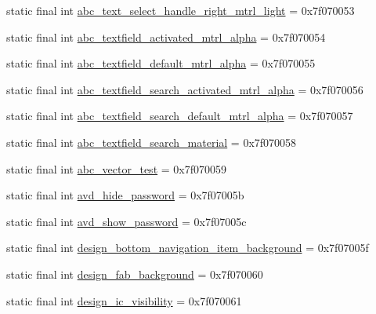 \begin{DoxyCompactItemize}
static final int \mbox{\hyperlink{classandroid_1_1support_1_1design_1_1_r_1_1drawable_a60a81d3c3c729bb2d56b498af413fef4}{abc\+\_\+text\+\_\+select\+\_\+handle\+\_\+right\+\_\+mtrl\+\_\+light}} = 0x7f070053
\item 
static final int \mbox{\hyperlink{classandroid_1_1support_1_1design_1_1_r_1_1drawable_aa02b26fea5203408b3ddbc9b3d851b43}{abc\+\_\+textfield\+\_\+activated\+\_\+mtrl\+\_\+alpha}} = 0x7f070054
\item 
static final int \mbox{\hyperlink{classandroid_1_1support_1_1design_1_1_r_1_1drawable_a83013ff30b4b94fce2e82793a1d333fe}{abc\+\_\+textfield\+\_\+default\+\_\+mtrl\+\_\+alpha}} = 0x7f070055
\item 
static final int \mbox{\hyperlink{classandroid_1_1support_1_1design_1_1_r_1_1drawable_ab64a8a976522cb59b31240bf4b5e64d5}{abc\+\_\+textfield\+\_\+search\+\_\+activated\+\_\+mtrl\+\_\+alpha}} = 0x7f070056
\item 
static final int \mbox{\hyperlink{classandroid_1_1support_1_1design_1_1_r_1_1drawable_ab66a327f415e4174b7123e9304719789}{abc\+\_\+textfield\+\_\+search\+\_\+default\+\_\+mtrl\+\_\+alpha}} = 0x7f070057
\item 
static final int \mbox{\hyperlink{classandroid_1_1support_1_1design_1_1_r_1_1drawable_a598e8d229c729b88ac087f388a110253}{abc\+\_\+textfield\+\_\+search\+\_\+material}} = 0x7f070058
\item 
static final int \mbox{\hyperlink{classandroid_1_1support_1_1design_1_1_r_1_1drawable_a534fff8a666c0ec8d9613530e8b5c245}{abc\+\_\+vector\+\_\+test}} = 0x7f070059
\item 
static final int \mbox{\hyperlink{classandroid_1_1support_1_1design_1_1_r_1_1drawable_a118877575ec9c53b0d7975c4c6fbe2a0}{avd\+\_\+hide\+\_\+password}} = 0x7f07005b
\item 
static final int \mbox{\hyperlink{classandroid_1_1support_1_1design_1_1_r_1_1drawable_a64264ee194e4e26ef6aac77c8261877e}{avd\+\_\+show\+\_\+password}} = 0x7f07005c
\item 
static final int \mbox{\hyperlink{classandroid_1_1support_1_1design_1_1_r_1_1drawable_ab6171fe7256feb28766b462a220f08e7}{design\+\_\+bottom\+\_\+navigation\+\_\+item\+\_\+background}} = 0x7f07005f
\item 
static final int \mbox{\hyperlink{classandroid_1_1support_1_1design_1_1_r_1_1drawable_a0d7cbbfe5f73f4ebc521ac3831a8f7fa}{design\+\_\+fab\+\_\+background}} = 0x7f070060
\item 
static final int \mbox{\hyperlink{classandroid_1_1support_1_1design_1_1_r_1_1drawable_a587fde5e3de93a6423e1bb577f382909}{design\+\_\+ic\+\_\+visibility}} = 0x7f070061

\end{DoxyCompactItemize}
